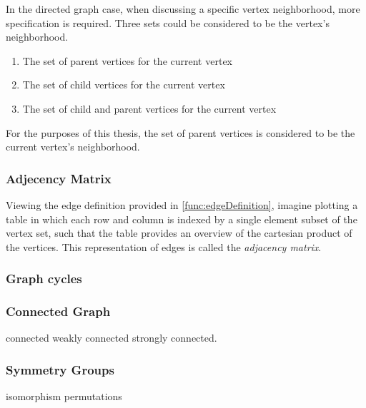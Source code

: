 In the directed graph case, when discussing a specific vertex neighborhood, more specification is required.
Three sets could be considered to be the vertex's neighborhood.
\begin{enumerate}
    \item The set of parent vertices for the current vertex
    \item The set of child vertices for the current vertex
    \item The set of child and parent vertices for the current vertex
\end{enumerate}

For the purposes of this thesis, the set of parent vertices is considered to be the current vertex's neighborhood.



\subsubsection{Adjecency Matrix}

Viewing the edge definition provided in \ref{func:edgeDefinition}, 
imagine plotting a table in which each row and column is indexed by a single element subset of the vertex set, 
such that the table provides an overview of the cartesian product of the vertices. 
This representation of edges is called the \textit{adjacency matrix}.



\subsubsection{Graph cycles}






\subsubsection{Connected Graph}
connected
weakly connected
strongly connected.
\subsubsection{Symmetry Groups}
isomorphism
permutations






